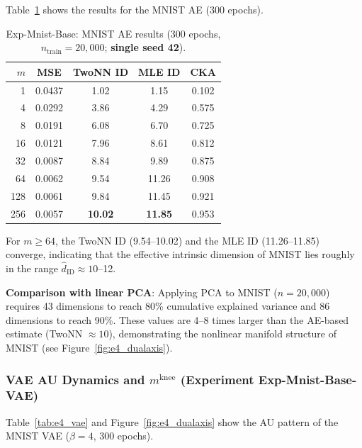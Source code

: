 \documentclass[make,article,submit,pdftex,moreauthors]{Definitions/mdpi}
\newcommand{\mknee}{m^{\mathrm{knee}}}
\begin{document}
Table~\ref{tab:e4_ae} shows the results for the MNIST AE (300 epochs).

\begin{table}[H]
\centering
\caption{Exp-Mnist-Base: MNIST AE results (300 epochs, $n_\mathrm{train}=20{,}000$; \textbf{single seed 42}).}
\label{tab:e4_ae}
\small
\begin{tabular}{rcccc}
\toprule
$m$ & MSE & TwoNN ID & MLE ID & CKA \\
\midrule
1   & 0.0437 & 1.02  & 1.15  & 0.102 \\
4   & 0.0292 & 3.86  & 4.29  & 0.575 \\
8   & 0.0191 & 6.08  & 6.70  & 0.725 \\
16  & 0.0121 & 7.96  & 8.61  & 0.812 \\
32  & 0.0087 & 8.84  & 9.89  & 0.875 \\
64  & 0.0062 & 9.54  & 11.26 & 0.908 \\
128 & 0.0061 & 9.84  & 11.45 & 0.921 \\
256 & 0.0057 & \textbf{10.02} & \textbf{11.85} & 0.953 \\
\bottomrule
\end{tabular}
\end{table}

For $m \geq 64$, the TwoNN ID (9.54--10.02) and the MLE ID (11.26--11.85) converge,
indicating that the effective intrinsic dimension of MNIST lies roughly in the range
$\hat{d}_\mathrm{ID} \approx 10$--12.

\textbf{Comparison with linear PCA}:
Applying PCA to MNIST ($n = 20{,}000$) requires 43 dimensions to reach 80\% cumulative
explained variance and 86 dimensions to reach 90\%.
These values are 4--8 times larger than the AE-based estimate (TwoNN $\approx 10$),
demonstrating the nonlinear manifold structure of MNIST (see Figure~\ref{fig:e4_dualaxis}).

\subsubsection{VAE AU Dynamics and $\mknee$ (Experiment Exp-Mnist-Base-VAE)}

Table~\ref{tab:e4_vae} and Figure~\ref{fig:e4_dualaxis} show the AU pattern of the MNIST VAE
($\beta = 4$, 300 epochs).
\end{document}
